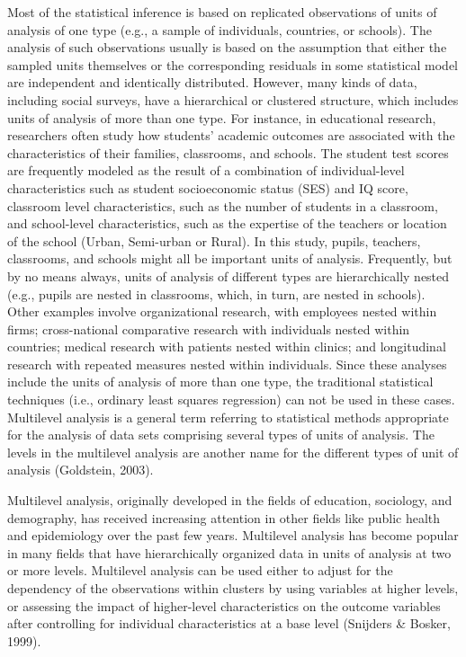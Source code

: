 \documentclass[12pt,oneside,a4paper]{reedthesis}
\begin{document}
Most of the statistical inference is based on replicated observations of units of analysis of one type (e.g., a sample of individuals, countries, or schools). The analysis of such observations usually is based on the assumption that either the sampled units themselves or the corresponding residuals in some statistical model are independent and identically distributed. However, many kinds of data, including social surveys, have a hierarchical or clustered structure, which includes units of analysis of more than one type. For instance, in educational research, researchers often study how students' academic outcomes are associated with the characteristics of their families, classrooms, and schools. The student test scores are frequently modeled as the result of a combination of individual-level characteristics such as student socioeconomic status (SES) and IQ score, classroom level characteristics, such as the number of students in a classroom, and school-level characteristics, such as the expertise of the teachers or location of the school (Urban, Semi-urban or Rural). In this study, pupils, teachers, classrooms, and schools might all be important units of analysis. Frequently, but by no means always, units of analysis of different types are hierarchically nested (e.g., pupils are nested in classrooms, which, in turn, are nested in schools). Other examples involve organizational research, with employees nested within firms; cross-national comparative research with individuals nested within countries; medical research with patients nested within clinics; and longitudinal research with repeated measures nested within individuals.
Since these analyses include the units of analysis of more than one type, the traditional statistical techniques (i.e., ordinary least squares regression) can not be used in these cases. Multilevel analysis is a general term referring to statistical methods appropriate for the analysis of data sets comprising several types of units of analysis. The levels in the multilevel analysis are another name for the different types of unit of analysis (Goldstein, 2003).

Multilevel analysis, originally developed in the fields of education, sociology, and demography, has received increasing attention in other fields like public health and epidemiology over the past few years. Multilevel analysis has become popular in many fields that have hierarchically organized data in units of analysis at two or more levels. Multilevel analysis can be used either to adjust for the dependency of the observations within clusters by using variables at higher levels, or assessing the impact of higher-level characteristics on the outcome variables after controlling for individual characteristics at a base level (Snijders \& Bosker, 1999).
\end{document}
